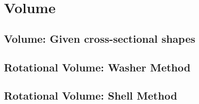 \section{Volume}

\subsection{Volume: Given cross-sectional shapes}
\subsection{Rotational Volume: Washer Method}
\subsection{Rotational Volume: Shell Method}